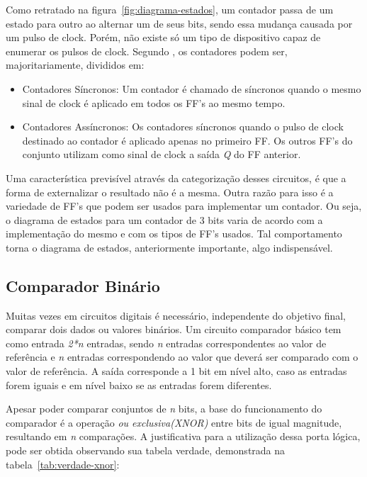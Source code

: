 \documentclass[12pt]{article}
\begin{document}
Como retratado na figura~\ref{fig:diagrama-estados}, um contador passa de um estado para outro ao alternar um de seus bits, sendo essa mudança  causada por um pulso de clock. Porém, não existe só um tipo de dispositivo capaz de enumerar os pulsos de clock. Segundo \cite{singh2006digital}, os contadores podem ser, majoritariamente, divididos em:

\begin{itemize}
\item{Contadores Síncronos: }
Um contador é chamado de síncronos quando o mesmo sinal de clock é aplicado em todos os FF's ao mesmo tempo.
\end{itemize}

\begin{itemize}
\item{Contadores Assíncronos: }
Os contadores síncronos quando o pulso de clock destinado ao contador é aplicado apenas no primeiro FF. Os outros FF's do conjunto utilizam como sinal de clock a saída \textit{Q} do FF anterior.
\end{itemize}

Uma característica previsível através da categorização desses circuitos, é que a forma de externalizar o resultado não é a mesma. Outra razão para isso é a variedade de FF's que podem ser usados para implementar um contador. Ou seja, o diagrama de estados para um contador de 3 bits varia de acordo com a implementação do mesmo e com os tipos de FF's usados. Tal comportamento torna o diagrama de estados, anteriormente importante, algo indispensável.

\subsection{Comparador Binário}

Muitas vezes em circuitos digitais é necessário, independente do objetivo final, comparar dois dados ou valores binários. Um circuito comparador básico tem como entrada \textit{2*n} entradas, sendo \textit{n} entradas correspondentes ao valor de referência e \textit{n} entradas correspondendo ao valor que deverá ser comparado com o valor de referência. A saída corresponde a 1 bit em nível alto, caso as entradas forem iguais e em nível baixo se as entradas forem diferentes\cite{tocci1997digital,  floyd2011digital}.

Apesar poder comparar conjuntos de \textit{n} bits, a base do funcionamento do comparador é a operação \textit{ou exclusiva(XNOR)} entre bits de igual magnitude, resultando em \textit{n} comparações. A justificativa para a utilização dessa porta lógica, pode ser obtida observando sua tabela verdade, demonstrada na tabela~\ref{tab:verdade-xnor}:
\end{document}
